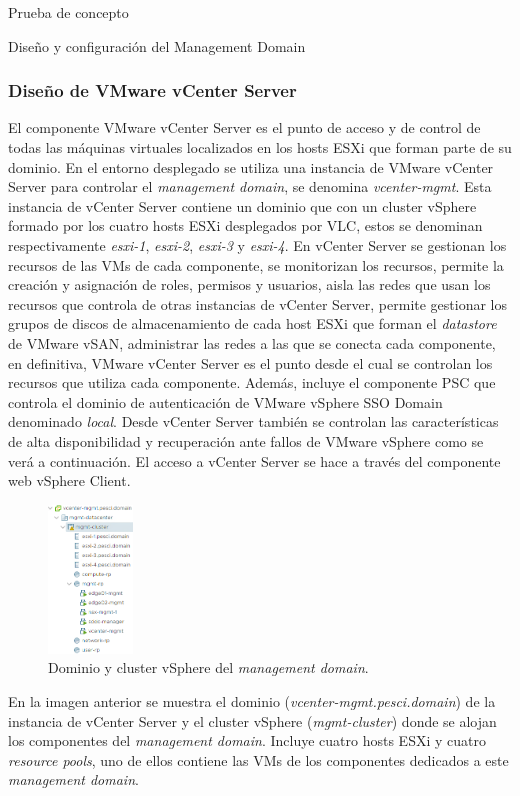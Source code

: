 \begin{section}{Prueba de concepto}
\begin{subsection}{Diseño y configuración del Management Domain}
    \subsubsection{Diseño de VMware vCenter Server}
    El componente VMware vCenter Server es el punto de acceso y de control de todas las máquinas virtuales localizados en los hosts ESXi que forman parte de su dominio. En el entorno desplegado se utiliza una instancia de VMware vCenter Server para controlar el \textit{management domain}, se denomina \textit{vcenter-mgmt}. Esta instancia de vCenter Server contiene un dominio que con un cluster vSphere formado por los cuatro hosts ESXi desplegados por VLC, estos se denominan respectivamente \textit{esxi-1}, \textit{esxi-2}, \textit{esxi-3} y \textit{esxi-4}. En vCenter Server se gestionan los recursos de las VMs de cada componente, se monitorizan los recursos, permite la creación y asignación de roles, permisos y usuarios, aisla las redes que usan los recursos que controla de otras instancias de vCenter Server, permite gestionar los grupos de discos de almacenamiento de cada host ESXi que forman el \textit{datastore} de VMware vSAN, administrar las redes a las que se conecta cada componente, en definitiva, VMware vCenter Server es el punto desde el cual se controlan los recursos que utiliza cada componente. Además, incluye el componente PSC que controla el dominio de autenticación de VMware vSphere SSO Domain denominado \textit{local}. Desde vCenter Server también se controlan las características de alta disponibilidad y recuperación ante fallos de VMware vSphere como se verá a continuación. El acceso a vCenter Server se hace a través del componente web vSphere Client.
    \begin{figure}[h]
      \centering
      \includegraphics[width=0.2\textwidth]{imaxes/pruebaconcepto/clusterVCenterServer.png}
      \caption{Dominio y cluster vSphere del \textit{management domain}.}
      \label{fig:cluster-vCenter-Server}
    \end{figure}
    \FloatBarrier
    En la imagen anterior se muestra el dominio (\textit{vcenter-mgmt.pesci.domain}) de la instancia de vCenter Server y el cluster vSphere (\textit{mgmt-cluster}) donde se alojan los componentes del \textit{management domain}. Incluye cuatro hosts ESXi y cuatro \textit{resource pools}, uno de ellos contiene las VMs de los componentes dedicados a este \textit{management domain}.

\end{subsection}
\end{section}

